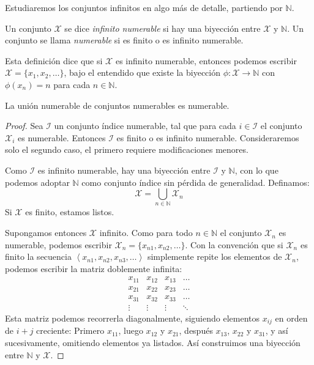   Estudiaremos los conjuntos infinitos en algo más de detalle,
  partiendo por \(\mathbb{N}\).
  \begin{definition}
    Un conjunto \(\mathcal{X}\) se dice \emph{infinito numerable}
    si hay una biyección entre \(\mathcal{X}\) y \(\mathbb{N}\).
    Un conjunto se llama \emph{numerable} si es finito
    o es infinito numerable.
  \end{definition}
  Esta definición dice que si \(\mathcal{X}\) es infinito numerable,
  entonces podemos escribir \(\mathcal{X} = \{x_1, x_2, \dotsc\}\),
  bajo el entendido
  que existe la biyección
    \(\phi \colon \mathcal{X} \rightarrow \mathbb{N}\)
  con \(\phi(x_n) = n\) para cada \(n \in \mathbb{N}\).
  \begin{theorem}
    \label{theo:union-numerable}
    La unión numerable de conjuntos numerables es numerable.
  \end{theorem}
  \begin{proof}
    Sea \(\mathcal{I}\) un conjunto índice numerable,
    tal que para cada \(i \in \mathcal{I}\)
    el conjunto \(\mathcal{X}_i\) es numerable.
    Entonces \(\mathcal{I}\) es finito o es infinito numerable.
    Consideraremos solo el segundo caso,
    el primero requiere modificaciones menores.

    Como \(\mathcal{I}\) es infinito numerable,
    hay una biyección entre \(\mathcal{I}\) y \(\mathbb{N}\),
    con lo que podemos adoptar \(\mathbb{N}\) como conjunto índice
    sin pérdida de generalidad.
    Definamos:
    \begin{equation*}
      \mathcal{X}
	= \bigcup_{n \in \mathbb{N}} \mathcal{X}_n
    \end{equation*}
    Si \(\mathcal{X}\) es finito,
    estamos listos.

    Supongamos entonces \(\mathcal{X}\) infinito.
    Como para todo \(n \in \mathbb{N}\)
    el conjunto \(\mathcal{X}_n\) es numerable,
    podemos escribir
      \(\mathcal{X}_n = \{x_{n 1}, x_{n 2}, \dotsc\}\).
    Con la convención que si \(\mathcal{X}_n\) es finito
    la secuencia
       \(\left\langle
	   x_{n 1}, x_{n 2}, x_{n 3}, \dotsc
	 \right\rangle\)
    simplemente repite los elementos de \(\mathcal{X}_n\),
    podemos escribir la matriz doblemente infinita:
    \begin{equation*}
      \begin{array}{*{4}{c}}
	x_{1 1} & x_{1 2} & x_{1 3} & \dotso \\
	x_{2 1} & x_{2 2} & x_{2 3} & \dotso \\
	x_{3 1} & x_{3 2} & x_{3 3} & \dotso \\
	\vdots	& \vdots  & \vdots  & \ddots
      \end{array}
    \end{equation*}
    Esta matriz podemos recorrerla diagonalmente,
    siguiendo elementos \(x_{i j}\) en orden de \(i + j\) creciente:
    Primero \(x_{1 1}\),
    luego \(x_{1 2}\) y \(x_{2 1}\),
    después \(x_{1 3}\), \(x_{2 2}\) y \(x_{3 1}\),
    y así sucesivamente,
    omitiendo elementos ya listados.
    Así construimos una biyección
    entre \(\mathbb{N}\) y \(\mathcal{X}\).
  \end{proof}
